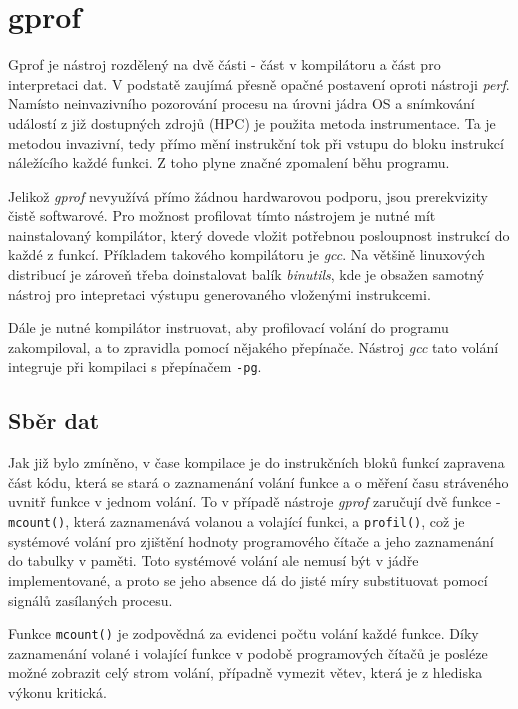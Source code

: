 \documentclass[czech,BP]{thesiskiv}
\begin{document}
\section{gprof}\label{subsec:gprof}

Gprof je nástroj rozdělený na dvě části - část v kompilátoru a část pro interpretaci dat. V podstatě zaujímá přesně opačné postavení oproti nástroji \emph{perf}. Namísto neinvazivního pozorování procesu na úrovni jádra OS a snímkování událostí z již dostupných zdrojů (HPC) je použita metoda instrumentace. Ta je metodou invazivní, tedy přímo mění instrukční tok při vstupu do bloku instrukcí náležícího každé funkci. Z toho plyne značné zpomalení běhu programu.

Jelikož \emph{gprof} nevyužívá přímo žádnou hardwarovou podporu, jsou prerekvizity čistě softwarové. Pro možnost profilovat tímto nástrojem je nutné mít nainstalovaný kompilátor, který dovede vložit potřebnou posloupnost instrukcí do každé z funkcí. Příkladem takového kompilátoru je \emph{gcc}. Na většině linuxových distribucí je zároveň třeba doinstalovat balík \emph{binutils}, kde je obsažen samotný nástroj pro intepretaci výstupu generovaného vloženými instrukcemi.

Dále je nutné kompilátor instruovat, aby profilovací volání do programu zakompiloval, a to zpravidla pomocí nějakého přepínače. Nástroj \emph{gcc} tato volání integruje při kompilaci s přepínačem \texttt{-pg}.

\subsection*{Sběr dat}

Jak již bylo zmíněno, v čase kompilace je do instrukčních bloků funkcí zapravena část kódu, která se stará o zaznamenání volání funkce a o měření času stráveného uvnitř funkce v jednom volání. To v případě nástroje \emph{gprof} zaručují dvě funkce - \texttt{mcount()}, která zaznamenává volanou a volající funkci, a \texttt{profil()}, což je systémové volání pro zjištění hodnoty programového čítače a jeho zaznamenání do tabulky v paměti\cite{gprof2}. Toto systémové volání ale nemusí být v jádře implementované, a proto se jeho absence dá do jisté míry substituovat pomocí signálů zasílaných procesu.

Funkce \texttt{mcount()} je zodpovědná za evidenci počtu volání každé funkce. Díky zaznamenání volané i volající funkce v podobě programových čítačů je posléze možné zobrazit celý strom volání, případně vymezit větev, která je z hlediska výkonu kritická.
\end{document}
